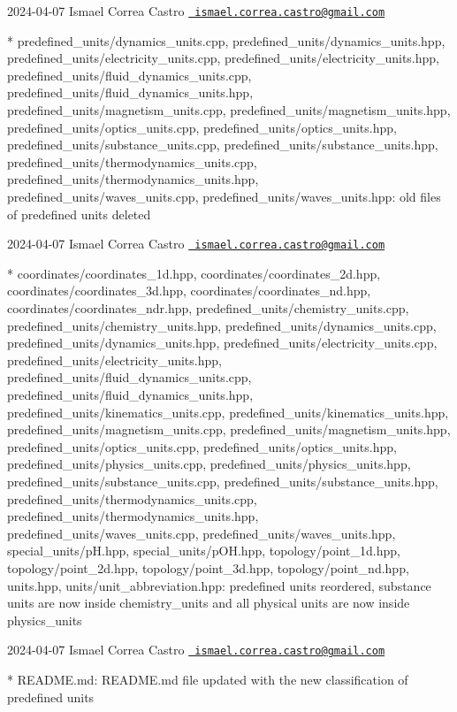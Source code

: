  2024-\/04-\/07 Ismael Correa Castro \href{mailto:ismael.correa.castro@gmail.com}{\texttt{ ismael.\+correa.\+castro@gmail.\+com}} \begin{DoxyVerb}* predefined_units/dynamics_units.cpp,
predefined_units/dynamics_units.hpp,
predefined_units/electricity_units.cpp,
predefined_units/electricity_units.hpp,
predefined_units/fluid_dynamics_units.cpp,
predefined_units/fluid_dynamics_units.hpp,
predefined_units/magnetism_units.cpp,
predefined_units/magnetism_units.hpp,
predefined_units/optics_units.cpp,
predefined_units/optics_units.hpp,
predefined_units/substance_units.cpp,
predefined_units/substance_units.hpp,
predefined_units/thermodynamics_units.cpp,
predefined_units/thermodynamics_units.hpp,
predefined_units/waves_units.cpp, predefined_units/waves_units.hpp: 
old files of predefined units deleted
\end{DoxyVerb}
 2024-\/04-\/07 Ismael Correa Castro \href{mailto:ismael.correa.castro@gmail.com}{\texttt{ ismael.\+correa.\+castro@gmail.\+com}} \begin{DoxyVerb}* coordinates/coordinates_1d.hpp, coordinates/coordinates_2d.hpp,
coordinates/coordinates_3d.hpp, coordinates/coordinates_nd.hpp,
coordinates/coordinates_ndr.hpp,
predefined_units/chemistry_units.cpp,
predefined_units/chemistry_units.hpp,
predefined_units/dynamics_units.cpp,
predefined_units/dynamics_units.hpp,
predefined_units/electricity_units.cpp,
predefined_units/electricity_units.hpp,
predefined_units/fluid_dynamics_units.cpp,
predefined_units/fluid_dynamics_units.hpp,
predefined_units/kinematics_units.cpp,
predefined_units/kinematics_units.hpp,
predefined_units/magnetism_units.cpp,
predefined_units/magnetism_units.hpp,
predefined_units/optics_units.cpp,
predefined_units/optics_units.hpp,
predefined_units/physics_units.cpp,
predefined_units/physics_units.hpp,
predefined_units/substance_units.cpp,
predefined_units/substance_units.hpp,
predefined_units/thermodynamics_units.cpp,
predefined_units/thermodynamics_units.hpp,
predefined_units/waves_units.cpp, predefined_units/waves_units.hpp,
special_units/pH.hpp, special_units/pOH.hpp, topology/point_1d.hpp,
topology/point_2d.hpp, topology/point_3d.hpp,
topology/point_nd.hpp, units.hpp, units/unit_abbreviation.hpp: 
predefined units reordered, substance units are now inside
chemistry_units and all physical units are now inside physics_units
\end{DoxyVerb}
 2024-\/04-\/07 Ismael Correa Castro \href{mailto:ismael.correa.castro@gmail.com}{\texttt{ ismael.\+correa.\+castro@gmail.\+com}} \begin{DoxyVerb}* README.md: README.md file updated with the new classification of
predefined units
\end{DoxyVerb}
